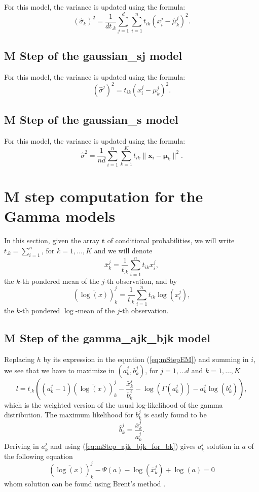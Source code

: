 \documentclass[a4paper,10pt]{article}
\newcommand{\bx}{\mathbf{x}}
\newcommand{\bt}{\mathbf{t}}
\newcommand{\bmu}{\boldsymbol{\mu}}
\begin{document}
For this model, the variance is updated using the formula:
$$
(\hat{\sigma}_k)^2 = \frac{1}{d t_{.k}} \sum_{j=1}^d\sum_{i=1}^n t_{ik} (x^j_i-\hat{\mu}^j_k)^2.
$$

\subsection{M Step of the gaussian\_sj model}

For this model, the variance is updated using the formula:
$$
(\hat{\sigma}^j)^2 =  t_{ik} (x^j_i-\mu^j_k)^2.
$$

\subsection{M Step of the gaussian\_s model}

For this model, the variance is updated using the formula:
$$
\hat{\sigma}^2 = \frac{1}{nd} \sum_{i=1}^n \sum_{k=1}^K t_{ik} \|\bx_i-\bmu_k\|^2.
$$

\section{M step computation for the Gamma models}
In this section, given the array $\bt$ of conditional probabilities, we will write
$t_{.k} = \sum_{i=1}^n$, for $k=1,\ldots,K$ and we will denote
$$
\bar{x}^j_k = \frac{1}{t_{.k}} \sum_{i=1}^n t_{ik} x^j_i,
$$
the $k$-th pondered mean of the $j$-th observation, and by
$$
(\overline{\log(x)})^j_k = \frac{1}{t_{.k}} \sum_{i=1}^n t_{ik} \log(x^j_i),
$$
the $k$-th pondered $\log$-mean of the $j$-th observation.

\subsection{M Step of the gamma\_ajk\_bjk model}
Replacing $h$ by its expression in the equation (\ref{eq:mStepEM}) and summing in $i$, we see that we have to maximize in
$(a^j_k,b^j_k)$, for $j=1,\ldots d$ and $k=1,\ldots, K$
\begin{equation}\label{eq:mStep_ajk_bjk}
l = t_{.k} \left( (a^j_k-1)(\overline{\log(x)})^j_k - \frac{\bar{x}^j_k}{b^j_k} - \log(\Gamma(a^j_k)) - a^j_k \log(b^j_k) \right),
\end{equation}
which is the weighted version of the usual log-likelihood of the gamma distribution. The maximum likelihood for $b^j_k$ is
easily found to be
\begin{equation}\label{eq:mStep_ajk_bjk_for_bk}
\hat{b}^j_k = \frac{\bar{x}^j_k}{a^j_k}.
\end{equation}
Deriving in $a^j_k$ and using (\ref{eq:mStep_ajk_bjk_for_bk}) gives $a^j_k$ solution in $a$ of the
following equation
\begin{equation}\label{eq:mStep_ajk_bjk_zero}
  (\overline{\log(x)})^j_k - \Psi(a) - \log(\bar{x}^j_k) + \log(a) =0
\end{equation}
whom solution can be found using Brent's method \cite{Brent1973}.
\end{document}
